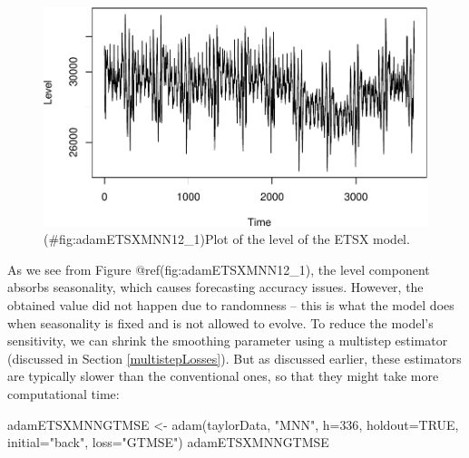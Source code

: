 \documentclass[
]{book}
\newenvironment{Shaded}{\begin{snugshade}}{\end{snugshade}}
\newcommand{\AttributeTok}[1]{\textcolor[rgb]{0.77,0.63,0.00}{#1}}
\newcommand{\ConstantTok}[1]{\textcolor[rgb]{0.00,0.00,0.00}{#1}}
\newcommand{\DecValTok}[1]{\textcolor[rgb]{0.00,0.00,0.81}{#1}}
\newcommand{\FunctionTok}[1]{\textcolor[rgb]{0.00,0.00,0.00}{#1}}
\newcommand{\NormalTok}[1]{#1}
\newcommand{\OtherTok}[1]{\textcolor[rgb]{0.56,0.35,0.01}{#1}}
\newcommand{\SpecialCharTok}[1]{\textcolor[rgb]{0.00,0.00,0.00}{#1}}
\newcommand{\StringTok}[1]{\textcolor[rgb]{0.31,0.60,0.02}{#1}}
\theoremstyle{definition}
\theoremstyle{definition}
\theoremstyle{definition}
\theoremstyle{definition}
\theoremstyle{remark}
\begin{document}
\begin{Shaded}
\end{Shaded}

\begin{figure}
\centering
\includegraphics{Svetunkov--2022----ADAM_files/figure-latex/adamETSXMNN12_1-1.pdf}
\caption{(\#fig:adamETSXMNN12\_1)Plot of the level of the ETSX model.}
\end{figure}

As we see from Figure @ref(fig:adamETSXMNN12\_1), the level component absorbs seasonality, which causes forecasting accuracy issues. However, the obtained value did not happen due to randomness -- this is what the model does when seasonality is fixed and is not allowed to evolve. To reduce the model's sensitivity, we can shrink the smoothing parameter using a multistep estimator (discussed in Section \ref{multistepLosses}). But as discussed earlier, these estimators are typically slower than the conventional ones, so that they might take more computational time:

\begin{Shaded}
\begin{Highlighting}[]
\NormalTok{adamETSXMNNGTMSE }\OtherTok{\textless{}{-}} \FunctionTok{adam}\NormalTok{(taylorData, }\StringTok{"MNN"}\NormalTok{,}
                         \AttributeTok{h=}\DecValTok{336}\NormalTok{, }\AttributeTok{holdout=}\ConstantTok{TRUE}\NormalTok{,}
                         \AttributeTok{initial=}\StringTok{"back"}\NormalTok{, }\AttributeTok{loss=}\StringTok{"GTMSE"}\NormalTok{)}
\NormalTok{adamETSXMNNGTMSE}
\end{Highlighting}
\end{Shaded}
\end{document}
